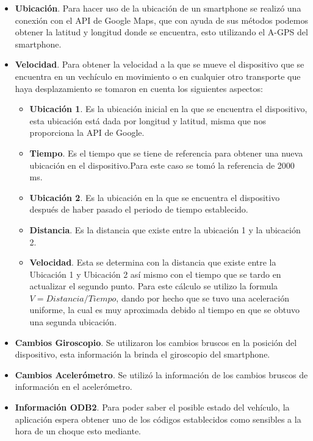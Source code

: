 \begin{itemize}
	\item \textbf{Ubicación}. Para hacer uso de la ubicación de un smartphone se realizó una conexión con el API de Google Maps, que con ayuda de sus métodos podemos obtener la latitud y longitud donde se encuentra, esto utilizando el A-GPS del smartphone.
	
	\item \textbf{Velocidad}. Para obtener la velocidad a la que se mueve el dispositivo que se encuentra en un vechículo en movimiento o en cualquier otro transporte que haya desplazamiento se tomaron en cuenta los siguientes aspectos:
	
	\begin{itemize}
		\item \textbf{Ubicación 1}. Es la ubicación inicial en la que se encuentra el dispositivo, esta ubicación está dada por longitud y latitud, misma que nos proporciona la API de Google.
		\item \textbf{Tiempo}. Es el tiempo que se tiene de referencia para obtener una nueva ubicación en el dispositivo.Para este caso se tomó la referencia de 2000 ms.
		\item \textbf{Ubicación 2}. Es la ubicación en la que se encuentra el dispositivo después de haber pasado el periodo de tiempo establecido.
		\item \textbf{Distancia}. Es la distancia que existe entre la ubicación 1 y la ubicación 2.
		\item \textbf{Velocidad}. Esta se determina con la distancia que existe entre la Ubicación 1 y Ubicación 2 así mismo con el tiempo que se tardo en actualizar el segundo punto. Para este cálculo se utilizo la formula $V = Distancia/Tiempo$, dando por hecho que se tuvo una aceleración uniforme, la cual es muy aproximada debido al tiempo en que se obtuvo una segunda ubicación.
	\end{itemize}

	\item \textbf{Cambios Giroscopio}. Se utilizaron los cambios bruscos en la posición del dispositivo, esta información la brinda el giroscopio del smartphone. 
	\item \textbf{Cambios Acelerómetro}. Se utilizó la información de los cambios bruscos de información en el acelerómetro.
	\item \textbf{Información ODB2}. Para poder saber el posible estado del vehículo, la aplicación espera obtener uno de los códigos establecidos como sensibles a la hora de un choque esto mediante.
\end{itemize}

